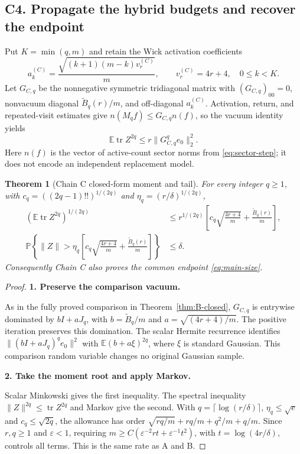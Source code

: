 \documentclass[11pt]{article}
\numberwithin{equation}{section}
\newtheorem{theorem}{Theorem}[section]
\theoremstyle{definition}\newtheorem{definition}[theorem]{Definition}
\theoremstyle{remark}\newtheorem{remark}[theorem]{Remark}
\newcommand{\tr}{\operatorname{tr}}\newcommand{\Ent}{\operatorname{Ent}}
\newcommand{\step}[1]{\par\addvspace{.65\baselineskip}\Needspace{4\baselineskip}\noindent\textbf{#1}\par\nobreak\smallskip}
\begin{document}
\subsection{C4. Propagate the hybrid budgets and recover the endpoint}
Put $K=\min(q,m)$ and retain the Wick activation coefficients
\begin{equation}\label{c:eq:off}
 a_k^{(C)}=\frac{\sqrt{(k+1)(m-k)v_r^{(C)}}}{m},
 \qquad v_r^{(C)}=4r+4,\quad 0\le k<K.
\end{equation}
Let $G_{C,q}$ be the nonnegative symmetric tridiagonal matrix with
$(G_{C,q})_{00}=0$, nonvacuum diagonal $\widetilde B_q(r)/m$, and off-diagonal
$a_k^{(C)}$. Activation, return, and repeated-visit estimates give
$n(M_qf)\le G_{C,q}n(f)$, so the vacuum identity yields
\begin{equation}\label{c:eq:stationary}
 \mathbb E\tr Z^{2q}\le r\|G_{C,q}^{q}e_0\|_2^2.
\end{equation}
Here $n(f)$ is the vector of active-count sector norms from
\eqref{eq:sector-step}; it does not encode an independent replacement model.

\begin{theorem}[Chain C closed-form moment and tail]\label{c:thm:closed}
For every integer $q\ge1$, with $c_q=((2q-1)!!)^{1/(2q)}$ and
$\eta_q=(r/\delta)^{1/(2q)}$,
\begin{align}
 (\mathbb E\tr Z^{2q})^{1/(2q)}
 &\le r^{1/(2q)}\left[c_q\sqrt{\frac{4r+4}{m}}+
                 \frac{\widetilde B_q(r)}{m}\right],\label{c:eq:closed}\\
 \mathbb P\!\left\{\|Z\|>
 \eta_q\left[c_q\sqrt{\frac{4r+4}{m}}+
                 \frac{\widetilde B_q(r)}{m}\right]\right\}&\le\delta.
 \label{c:eq:tail}
\end{align}
Consequently Chain C also proves the common endpoint \eqref{eq:main-size}.
\end{theorem}
\begin{proof}
\step{1. Preserve the comparison vacuum.}
As in the fully proved comparison in Theorem~\ref{thm:B-closed},
$G_{C,q}$ is entrywise dominated by
$bI+aJ_q$, with $b=\widetilde B_q/m$ and $a=\sqrt{(4r+4)/m}$.
The positive iteration preserves this domination. The scalar Hermite recurrence
identifies $\|(bI+aJ_q)^qe_0\|^2$ with $\mathbb E(b+a\xi)^{2q}$,
where $\xi$ is standard Gaussian. This comparison random variable changes no
original Gaussian sample.

\step{2. Take the moment root and apply Markov.}
Scalar Minkowski gives the first inequality. The spectral inequality
$\|Z\|^{2q}\le\tr Z^{2q}$ and Markov give the second. With
$q=\lceil\log(r/\delta)\rceil$, $\eta_q\le\sqrt e$ and
$c_q\le\sqrt{2q}$, the allowance has order
$\sqrt{rq/m}+rq/m+q^2/m+q/m$. Since $r,q\ge1$ and $\varepsilon<1$,
requiring $m\ge C(\varepsilon^{-2}rt+\varepsilon^{-1}t^2)$, with
$t=\log(4r/\delta)$, controls all terms. This is the same rate as A and B.
\end{proof}
\end{document}
